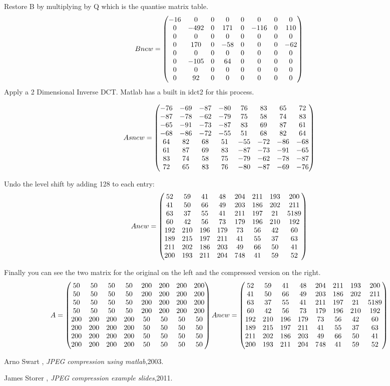 \documentclass[12pt]{article}
\begin{document}
Restore B by multiplying  by Q which is the quantise matrix table.
\[
Bnew=
\begin{pmatrix}
-16& 0& 0& 0& 0& 0& 0& 0\cr
0 &-492 &0 &171& 0 &-116 &0 &110\cr
0 &0& 0& 0& 0& 0& 0& 0\cr
0 &170 &0 &-58 &0 &0 &0 &-62\cr
0 &0& 0& 0& 0& 0& 0& 0\cr
0 &-105 &0 &64& 0 &0 &0 &0\cr
0 &0& 0& 0& 0& 0& 0& 0\cr
0 &92 &0 &0 &0 &0 &0 &0\cr
\end{pmatrix}
\]
Apply a 2 Dimensional Inverse DCT. Matlab has a built in idct2 for this process.

\[
Asnew=
\begin{pmatrix}
-76 &-69 &-87& -80& 76& 83& 65& 72\cr
-87 &-78 &-62 &-79 &75 &58 &74 &83\cr
-65 &-91& -73& -87&83&69& 87& 61\cr
-68 &-86 &-72 &-55 &51 &68 &82 &64\cr
64 &82& 68& 51& -55& -72& -86& -68\cr
61 &87 &69 &83 &-87 &-73 &-91 &-65\cr
83 &74& 58& 75& -79& -62& -78& -87\cr
72 &65 &83 &76 &-80 &-87 &-69 &-76\cr
\end{pmatrix}
\]

Undo the level shift by adding 128 to each entry:
\[
Anew=
\begin{pmatrix}
52 &59 &41& 48& 204& 211& 193& 200\cr
41 &50 &66 &49 &203 &186 &202 &211\cr
63 &37& 55& 41& 211& 197& 21&5 189\cr
60 &42 &56 &73 &179 &196 &210 &192\cr
192 &210& 196& 179& 73& 56& 42& 60\cr
189 &215 &197 &211 &41 &55 &37 &63\cr
211 &202& 186& 203& 49& 66& 50& 41\cr
200 &193 &211 &204& 748 &41 &59 &52\cr
\end{pmatrix}
\]

Finally you can see the two matrix for  the original on the left and the compressed version on the right.
\[
A=
\begin {pmatrix}
50 &50& 50& 50& 200& 200& 200& 200\cr
50 &50& 50& 50& 200& 200& 200& 200\cr
50 &50 &50 &50 &200& 200 &200 &200\cr
50& 50& 50& 50& 200& 200& 200& 200\cr
200 &200 &200 &200 &50 &50 &50 &50\cr
200 &200& 200& 200& 50& 50& 50& 50\cr
200 &200 &200 &200 &50 &50& 50 &50\cr
200& 200& 200& 200& 50& 50& 50& 50\cr
\end{pmatrix}
Anew=
\begin{pmatrix}
52 &59 &41& 48& 204& 211& 193& 200\cr
41 &50 &66 &49 &203 &186 &202 &211\cr
63 &37& 55& 41& 211& 197& 21&5 189\cr
60 &42 &56 &73 &179 &196 &210 &192\cr
192 &210& 196& 179& 73& 56& 42& 60\cr
189 &215 &197 &211 &41 &55 &37 &63\cr
211 &202& 186& 203& 49& 66& 50& 41\cr
200 &193 &211 &204& 748 &41 &59 &52\cr
\end{pmatrix}
\]
\newpage
\begin{thebibliography}{9}
Arno Swart ,
\emph{JPEG compression using matlab},2003.

James Storer ,
\emph{JPEG compression example slides},2011.
\end{thebibliography}
\end{document}
